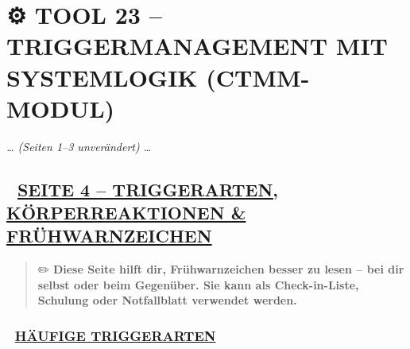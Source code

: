%


\hypertarget{tool-23-triggermanagement-mit-systemlogik-ctmm-modul}{%
\section{\texorpdfstring{\textbf{⚙️ TOOL 23 -- TRIGGERMANAGEMENT MIT SYSTEMLOGIK (CTMM-MODUL)}}{⚙️ TOOL 23 -- TRIGGERMANAGEMENT MIT SYSTEMLOGIK (CTMM-MODUL)}}\label{tool-23-triggermanagement-mit-systemlogik-ctmm-modul}}

\emph{\ldots{} (Seiten 1--3 unverändert) \ldots{}}

\hypertarget{seite-4-triggerarten-kuxf6rperreaktionen-fruxfchwarnzeichen}{%
\subsection{\texorpdfstring{\textbf{🧠 \ul{SEITE 4 -- TRIGGERARTEN, KÖRPERREAKTIONEN \& FRÜHWARNZEICHEN}}}{🧠 SEITE 4 -- TRIGGERARTEN, KÖRPERREAKTIONEN \& FRÜHWARNZEICHEN}}\label{seite-4-triggerarten-kuxf6rperreaktionen-fruxfchwarnzeichen}}

\begin{quote}
✏️ \textbf{Diese Seite hilft dir, Frühwarnzeichen besser zu lesen -- bei dir selbst oder beim Gegenüber. Sie kann als Check-in-Liste, Schulung oder Notfallblatt verwendet werden.}
\end{quote}

\hypertarget{huxe4ufige-triggerarten}{%
\subsubsection{\texorpdfstring{\textbf{🚨 \ul{HÄUFIGE TRIGGERARTEN}}}{🚨 HÄUFIGE TRIGGERARTEN}}\label{huxe4ufige-triggerarten}}

